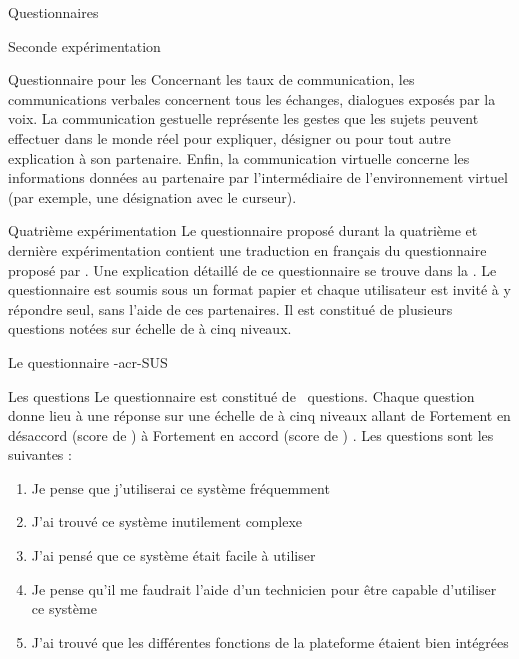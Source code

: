 \documentclass[myfrancais,ngerman,english,frenchb]{mythesis}
\begin{document}
\begin{mychapter}{Questionnaires}
\begin{mysection}{Seconde expérimentation}
\begin{mysubsection}{Questionnaire pour les }
				Concernant les taux de communication, les communications verbales concernent tous les échanges, dialogues exposés par la voix.
				La communication gestuelle représente les gestes que les sujets peuvent effectuer dans le monde réel pour expliquer, désigner ou pour tout autre explication à son partenaire.
				Enfin, la communication virtuelle concerne les informations données au partenaire par l'intermédiaire de l'environnement virtuel (par exemple, une désignation avec le curseur).
			\end{mysubsection}
		\end{mysection}
		\begin{mysection}{Quatrième expérimentation}
			Le questionnaire proposé durant la quatrième et dernière expérimentation contient une traduction en français du questionnaire  proposé par .
			Une explication détaillé de ce questionnaire se trouve dans la .
			Le questionnaire est soumis sous un format papier et chaque utilisateur est invité à y répondre seul, sans l'aide de ces partenaires.
			Il est constitué de plusieurs questions notées sur échelle de  à cinq niveaux.
			\begin{mysubsection}{Le questionnaire \myacronl-{acr-SUS}}
				\begin{mysubsubsection}{Les questions}
					Le questionnaire  est constitué de ~questions.
					Chaque question donne lieu à une réponse sur une échelle de  à cinq niveaux allant de \og Fortement en désaccord (score de ) \fg à \og Fortement en accord (score de ) \fg.
					Les questions sont les suivantes :
					\begin{enumerate}[label={Q\arabic*.},ref={Q\arabic*}]
						\item Je pense que j'utiliserai ce système fréquemment
						\item J'ai trouvé ce système inutilement complexe
						\item J'ai pensé que ce système était facile à utiliser
						\item Je pense qu'il me faudrait l'aide d'un technicien pour être capable d'utiliser ce système
						\item J'ai trouvé que les différentes fonctions de la plateforme étaient bien intégrées

\end{enumerate}
\end{mysubsubsection}
\end{mysubsection}
\end{mysection}
\end{mychapter}
\end{document}
